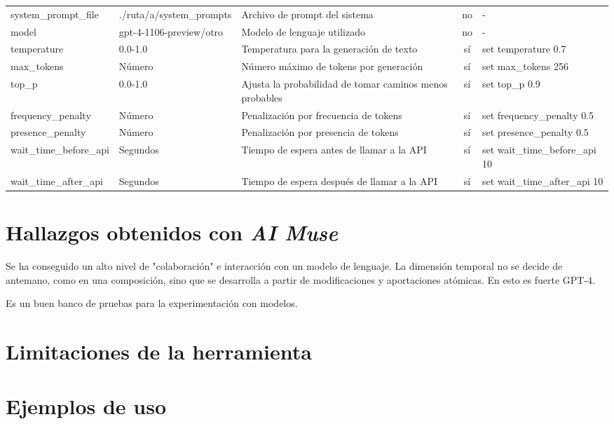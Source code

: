 \begin{landscape}
\begin{table}[htbp]
\begin{tabularx}{\linewidth}{lXlcl}
        system\_prompt\_file & \textcolor{pathcolor}{./ruta/a/system\_prompts} & Archivo de prompt del sistema & no & - \\
        model & gpt-4-1106-preview/otro & Modelo de lenguaje utilizado & no & - \\
        temperature & \textcolor{numbercolor}{0.0-1.0} & Temperatura para la generación de texto & sí & set temperature \textcolor{numbercolor}{0.7} \\
        max\_tokens & \textcolor{numbercolor}{Número} & Número máximo de tokens por generación & sí & set max\_tokens \textcolor{numbercolor}{256} \\
        top\_p & \textcolor{numbercolor}{0.0-1.0} & Ajusta la probabilidad de tomar caminos menos probables & sí & set top\_p \textcolor{numbercolor}{0.9} \\
        frequency\_penalty & \textcolor{numbercolor}{Número} & Penalización por frecuencia de tokens & sí & set frequency\_penalty \textcolor{numbercolor}{0.5} \\
        presence\_penalty & \textcolor{numbercolor}{Número} & Penalización por presencia de tokens & sí & set presence\_penalty \textcolor{numbercolor}{0.5} \\
        wait\_time\_before\_api & \textcolor{numbercolor}{Segundos} & Tiempo de espera antes de llamar a la API & sí & set wait\_time\_before\_api \textcolor{numbercolor}{10} \\
        wait\_time\_after\_api & \textcolor{numbercolor}{Segundos} & Tiempo de espera después de llamar a la API & sí & set wait\_time\_after\_api \textcolor{numbercolor}{10} \\
        \bottomrule
    \end{tabularx}
    \end{table}
    \end{landscape}
    





\section{Hallazgos obtenidos con \emph{AI Muse}}

Se ha conseguido un alto nivel de "colaboración" e interacción con un modelo de lenguaje. La dimensión temporal no se decide de antemano, como en una composición, sino que se desarrolla a partir de modificaciones y aportaciones atómicas. En esto es fuerte GPT-4.

Es un buen banco de pruebas para la experimentación con modelos. 

\section{Limitaciones de la herramienta}

\section{Ejemplos de uso}